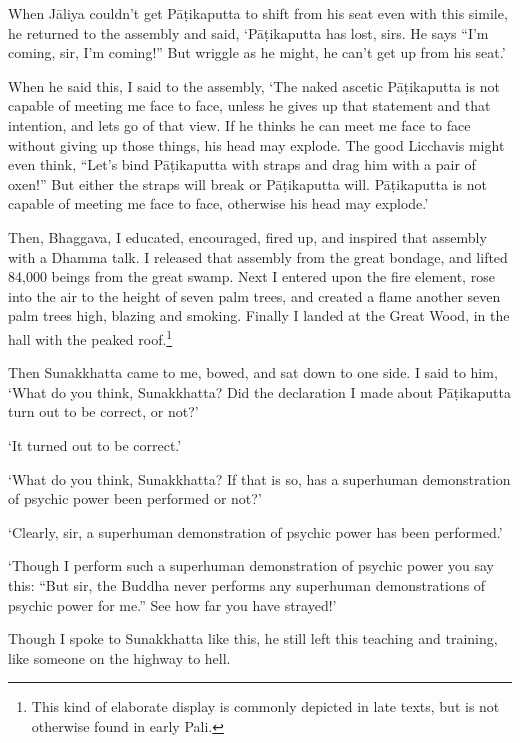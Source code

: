 \documentclass[12pt,openany]{book}%
\begin{document}
When \textsanskrit{Jāliya} couldn’t get \textsanskrit{Pāṭikaputta} to shift from his seat even with this simile, he returned to the assembly and said, ‘\textsanskrit{Pāṭikaputta} has lost, sirs. He says “I’m coming, sir, I’m coming!” But wriggle as he might, he can’t get up from his seat.’ 

When he said this, I said to the assembly, ‘The naked ascetic \textsanskrit{Pāṭikaputta} is not capable of meeting me face to face, unless he gives up that statement and that intention, and lets go of that view. If he thinks he can meet me face to face without giving up those things, his head may explode. The good Licchavis might even think, “Let’s bind \textsanskrit{Pāṭikaputta} with straps and drag him with a pair of oxen!” But either the straps will break or \textsanskrit{Pāṭikaputta} will. \textsanskrit{Pāṭikaputta} is not capable of meeting me face to face, otherwise his head may explode.’ 

Then, Bhaggava, I educated, encouraged, fired up, and inspired that assembly with a Dhamma talk. I released that assembly from the great bondage, and lifted 84,000 beings from the great swamp. Next I entered upon the fire element, rose into the air to the height of seven palm trees, and created a flame another seven palm trees high, blazing and smoking. Finally I landed at the Great Wood, in the hall with the peaked roof.\footnote{This kind of elaborate display is commonly depicted in late texts, but is not otherwise found in early Pali. } 

Then Sunakkhatta came to me, bowed, and sat down to one side. I said to him, ‘What do you think, Sunakkhatta? Did the declaration I made about \textsanskrit{Pāṭikaputta} turn out to be correct, or not?’ 

‘It turned out to be correct.’ 

‘What do you think, Sunakkhatta? If that is so, has a superhuman demonstration of psychic power been performed or not?’ 

‘Clearly, sir, a superhuman demonstration of psychic power has been performed.’ 

‘Though I perform such a superhuman demonstration of psychic power you say this: “But sir, the Buddha never performs any superhuman demonstrations of psychic power for me.” See how far you have strayed!’ 

Though I spoke to Sunakkhatta like this, he still left this teaching and training, like someone on the highway to hell. 
\end{document}
